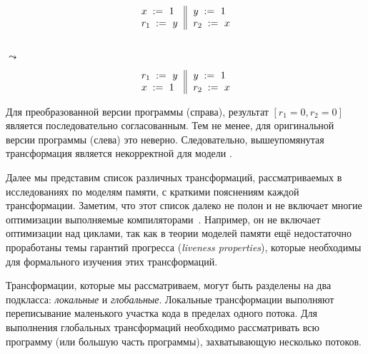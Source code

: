 \begin{minipage}{0.45\linewidth}
\begin{equation*}
\inarrII{
   \writeInst{}{x}{1}   \\
   \readInst{}{r_1}{y}  \\
}{
  \writeInst{}{y}{1}   \\
  \readInst{}{r_2}{x}  \\
}
\end{equation*}
\end{minipage}\hfill%
\begin{minipage}{0.05\linewidth}
\Large~\\ $\leadsto$
\end{minipage}\hfill%
\begin{minipage}{0.45\linewidth}
\begin{equation*}
\inarrII{
   \readInst{}{r_1}{y}  \\
   \writeInst{}{x}{1}   \\
}{
  \writeInst{}{y}{1}   \\
  \readInst{}{r_2}{x}  \\
}
\end{equation*}
\end{minipage}

Для преобразованной версии программы (справа),
результат $[r_1=0, r_2=0]$ является последовательно согласованным. 
Тем не менее, для оригинальной версии программы (слева) это неверно. 
Следовательно, вышеупомянутая трансформация 
является некорректной для модели \SC. 

Далее мы представим список различных трансформаций,
рассматриваемых в исследованиях по моделям памяти, 
с краткими пояснениям каждой трансформации. 
Заметим, что этот список далеко не полон 
и не включает многие оптимизации 
выполняемые компиляторами~\cite{Muchnick:ACDI97}.
Например, он не включает оптимизации над циклами,
так как в теории моделей памяти ещё недостаточно 
проработаны темы гарантий прогресса 
(\emph{liveness properties}), 
которые необходимы для формального 
изучения этих трансформаций. 

Трансформации, которые мы рассматриваем, могут быть 
разделены на два подкласса: \emph{локальные} и \emph{глобальные}.
Локальные трансформации выполняют переписывание 
маленького участка кода в пределах одного потока. 
Для выполнения глобальных трансформаций 
необходимо рассматривать всю программу 
(или большую часть программы), 
захватывающую несколько потоков.      
 
